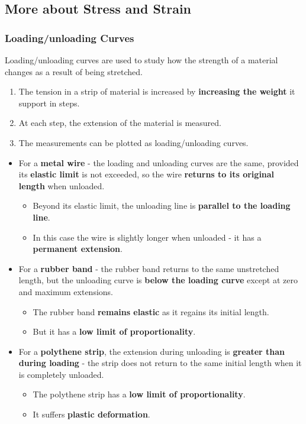 \subsection{More about Stress and Strain}

\subsubsection*{Loading/unloading Curves}

Loading/unloading curves are used to study how the strength of a material changes as a result of being stretched.

\begin{enumerate}
    \item The tension in a strip of material is increased by \textbf{increasing the weight} it support in steps.
    \item At each step, the extension of the material is measured.
    \item The measurements can be plotted as loading/unloading curves.
\end{enumerate}

\begin{itemize}
    \item For a \textbf{metal wire} - the loading and unloading curves are the same, provided its \textbf{elastic limit} is not exceeded, so the wire \textbf{returns to its original length} when unloaded.
        \begin{itemize}
            \item Beyond its elastic limit, the unloading line is \textbf{parallel to the loading line}.
            \item In this case the wire is slightly longer when unloaded - it has a \textbf{permanent extension}.
        \end{itemize}
    \item For a \textbf{rubber band} - the rubber band returns to the same unstretched length, but the unloading curve is \textbf{below the loading curve} except at zero and maximum extensions.
        \begin{itemize}
            \item The rubber band \textbf{remains elastic} as it regains its initial length.
            \item But it has a \textbf{low limit of proportionality}.
        \end{itemize}
    \item For a \textbf{polythene strip}, the extension during unloading is \textbf{greater than during loading} - the strip does not return to the same initial length when it is completely unloaded.
        \begin{itemize}
            \item The polythene strip has a \textbf{low limit of proportionality}.
            \item It suffers \textbf{plastic deformation}.
        \end{itemize}
\end{itemize}


